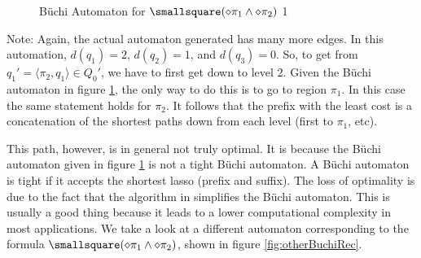 \begin{figure}
\centering
{}
\caption{B\"uchi Automaton for $\smallsquare(\diamond \pi_1 \land \diamond \pi_2 )$ 1}
\label{fig:gasBuchiRec}
\end{figure}
Note: Again, the actual automaton generated has many more edges. %
In this automation, $d(q_1)=2$, $d(q_2)=1$, and $d(q_3)=0$. So, to get from $q_{1}' = \langle \pi_2, q_1 \rangle \in Q_0'$, we have to first get down to level 2. Given the B\"{u}chi automaton in figure \ref{fig:gasBuchiRec}, the only way to do this is to go to region $\pi_1$.  In this case the same statement holds for $\pi_2$. It follows that the prefix with the least cost is a concatenation of the shortest paths down from each level (first to $\pi_1$, etc).


This path, however, is in general not truly optimal. It is because the B\"{u}chi automaton given in figure \ref{fig:gasBuchiRec} is not a tight B\"{u}chi automaton. A B\"{u}chi automaton is tight if it accepts the shortest lasso (prefix and suffix). The loss of optimality is due to the fact that the algorithm in \cite{gastin01} simplifies the B\"{u}chi automaton. This is usually a good thing because it leads to a lower computational complexity in most applications. We take a look at a different automaton corresponding to the formula $\smallsquare(\diamond \pi_1 \land \diamond \pi_2)$, shown in figure \ref{fig:otherBuchiRec}. 

